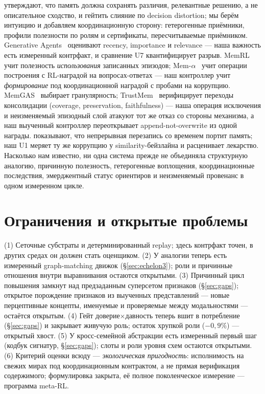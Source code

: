 \documentclass{article}
\begin{document}
\citet{rdd2026} утверждают, что память должна сохранять различия,
релевантные решению, а не описательное сходство, и гейтить слияние по
decision distortion; мы берём интуицию и добавляем координационную
сторону: гетерогенные приёмники, профили полезности по ролям и
сертификаты, пересчитываемые приёмником. Generative
Agents~\citep{genagents2023} оценивают recency, importance и
relevance --- наша важность есть измеренный контрфакт, и сравнение U7
квантифицирует разрыв. MemRL~\citep{memrl2026} учит полезность
\emph{использования} записанных эпизодов;
Mem-$\alpha$~\citep{memalpha2025} учит операции построения с
RL-наградой на вопросах-ответах --- наш контроллер учит
\emph{формирование} под координационной наградой с пробами на
коррупцию. MemGAS~\citep{memgas2025} выбирает гранулярность;
TrustMem~\citep{trustmem2026} верифицирует переходы консолидации
(coverage, preservation, faithfulness) --- наша операция исключения и
неизменяемый эпизодный слой атакуют тот же отказ со стороны
механизма, а наш выученный контроллер переоткрывает
append-not-overwrite из одной награды. \citet{faulty2026} показывают,
что непрерывная перезапись со временем портит память; наш U1 меряет
ту же коррупцию у similarity-бейзлайна и расценивает лекарство.
Насколько нам известно, ни одна система прежде не объединяла
структурную аналогию, причинную полезность, гетерогенные воплощения,
координационные последствия, эмерджентный статус ориентиров и
неизменяемый провенанс в одном измеренном цикле.

\section{Ограничения и открытые проблемы}
\label{sec:limits}

(1) Сеточные субстраты и детерминированный replay; здесь контрфакт
точен, в других средах он должен стать оценщиком. (2) У аналогии теперь есть измеренный graph-matching движок
(\S\ref{sec:echelon3}); роли и причинные отношения внутри
выравнивания остаются открытыми. (3) Причинный цикл
повышения замкнут над предзаданным суперсетом признаков
(\S\ref{sec:gaps}); открытое порождение признаков из выученных
представлений --- новые перцептивные концепты, именуемые и проверяемые
между модальностями --- остаётся открытым. (4) Гейт доверие$\times$давность теперь вшит в потребление
(\S\ref{sec:gaps}) и закрывает живучую роль; остаток хрупкой роли
($-0{,}9\%$) --- открытый хвост. (5) У кросс-семейной абстракции есть
измеренный первый шаг (кодбук сигнатур, \S\ref{sec:gaps}); слоты и
роли уровня схем остаются открытыми. (6) Критерий оценки всюду --- \emph{экологическая
пригодность}: исполнимость на свежих мирах под координационным
контрактом, а не прямая верификация содержимого; формулировка
закрыта, её полное поколенческое измерение --- программа meta-RL.
\end{document}
